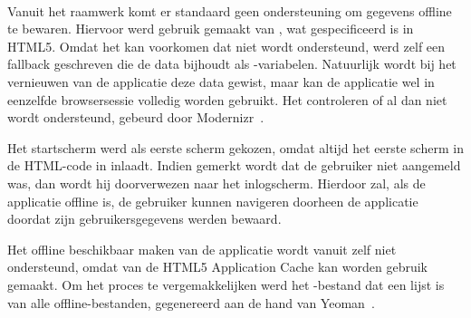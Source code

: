 \begin{table}[H]
\centering
{}
\caption{Gebruik voor U10: Offline}
\label{tabel:evaluatie-gebruik-u10}
\end{table}

\paragraph{\jqm}
Vanuit het raamwerk komt er standaard geen ondersteuning om gegevens offline te bewaren.
Hiervoor werd gebruik gemaakt van , wat gespecificeerd is in HTML5.
Omdat het kan voorkomen dat  niet wordt ondersteund, werd zelf een fallback geschreven die de data bijhoudt als \js{}-variabelen.
Natuurlijk wordt bij het vernieuwen van de applicatie deze data gewist, maar kan de applicatie wel in eenzelfde browsersessie volledig worden gebruikt.
Het controleren of  al dan niet wordt ondersteund, gebeurd door Modernizr~\cite{Modernizr2012}.


Het startscherm werd als eerste scherm gekozen, omdat \jqm{} altijd het eerste scherm in de HTML-code in inlaadt.
Indien gemerkt wordt dat de gebruiker niet aangemeld was, dan wordt hij doorverwezen naar het inlogscherm.
Hierdoor zal, als de applicatie offline is, de gebruiker kunnen navigeren doorheen de applicatie doordat zijn gebruikersgegevens werden bewaard.

Het offline beschikbaar maken van de applicatie wordt vanuit \jqm{} zelf niet ondersteund, omdat van de HTML5 Application Cache kan worden gebruik gemaakt.
Om het proces te vergemakkelijken werd het -bestand dat een lijst is van alle offline-bestanden, gegenereerd aan de hand van Yeoman~\cite{Yeoman2013}.

